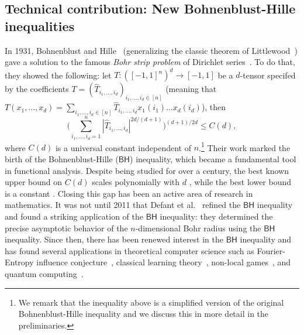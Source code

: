 \documentclass[11pt]{article}
\newcommand{\BH}{\textsf{BH}}
\theoremstyle{plain}
\theoremstyle{plain}
\theoremstyle{definition}
\theoremstyle{remark}
\theoremstyle{named}
\begin{document}
\subsection{Technical contribution: New Bohnenblust-Hille inequalities}
In 1931, Bohnenblust and Hille~\cite{bohnenblust1931absolute} (generalizing the classic theorem of Littlewood~\cite{littlewood1930bounded}) gave a solution to the famous \emph{Bohr strip problem} of Dirichlet series~\cite{bohr1913ueber}. To do that, they showed the following: let $T:([-1,1]^n)^d\rightarrow [-1,1]$ 
be a $d$-tensor specifed by the coefficients $T=(\widehat{T}_{i_1,\ldots,i_d})_{i_1,\ldots,i_d\in [n]}$ (meaning that $T(x_1,\dots,x_d)=\sum_{i_1,\dots,i_d\in [n]}\widehat{T}_{i_1,\ldots,i_d}x_1(i_1)\dots x_d(i_d)$),  then
\begin{equation}\label{eq:BHfortensors}
    \Big(\sum_{i_1,\ldots,i_d=1}^n |\widehat{T}_{i_1,\ldots,i_d}|^{2d/(d+1)}\Big)^{(d+1)/2d}\leq C(d),
\end{equation}
where $C(d)$ is a universal constant independent of $n$.\footnote{We remark that the inequality above is a simplified version of the original  Bohnenblust-Hille inequality and we discuss this in more detail in the preliminaries.}  Their work marked the birth of the Bohnenblust-Hille ($\BH$) inequality, which became a fundamental tool in functional analysis. Despite being studied for over a century, the best known upper bound on $C(d)$ scales polynomially with $d$ \cite{bayart2014bohr}, while the best lower bound is a constant \cite{diniz2014lower}. Closing this gap has been an active area of research in mathematics. It was not until 2011 that Defant et al.~\cite{defant2011bohnenblust} refined the $\BH$ inequality and found a striking application of the $\BH$ inequality: they determined the precise asymptotic behavior of the $n$-dimensional Bohr radius using the $\BH$ inequality. Since then, there has been renewed interest in the $\BH$ inequality and has found several applications in theoretical computer science such as Fourier-Entropy influence conjecture~\cite{arunachalam2021improved}, classical learning theory~\cite{eskenazis2022learning}, non-local games~\cite{montanaro2012some}, and quantum computing~\cite{huang2022learning,volberg2023noncommutative}.
\end{document}

